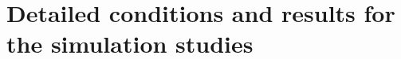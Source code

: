 \chapter{Detailed conditions and results for the simulation studies}


\newpage

\newpage

\newpage

\newpage

\cleardoublepage


